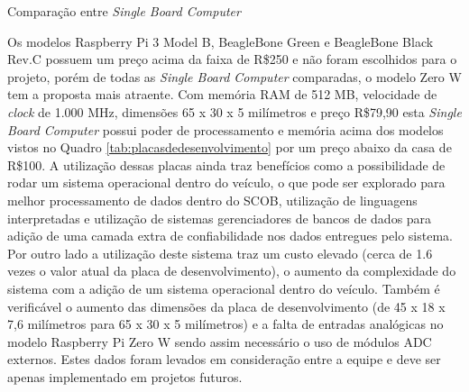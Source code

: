 \begin{table}[!htb]
	\centering
	\caption{Comparação entre \textit{Single Board Computer}}
	\label{tab:singleboard}
	\caption*{Fonte: Elaborada pelo autor, 2017.}
\end{table}

Os modelos Raspberry Pi 3 Model B, BeagleBone Green e BeagleBone Black Rev.C possuem um preço acima da faixa de R\$250 e não foram escolhidos para o projeto, porém de todas as \textit{Single Board Computer} comparadas, o modelo Zero W tem a proposta mais atraente. Com memória RAM de 512 MB, velocidade de \textit{clock} de 1.000 MHz, dimensões 65 x 30 x 5 milímetros e preço R\$79,90 esta \textit{Single Board Computer} possui poder de processamento e memória acima dos modelos vistos no Quadro \ref{tab:placasdedesenvolvimento} por um preço abaixo da casa de R\$100. A utilização dessas placas ainda traz benefícios como a possibilidade de rodar um sistema operacional dentro do veículo, o que pode ser explorado para melhor processamento de dados dentro do SCOB, utilização de linguagens interpretadas e utilização de sistemas gerenciadores de bancos de dados para adição de uma camada extra de confiabilidade nos dados entregues pelo sistema. Por outro lado a utilização deste sistema traz um custo elevado (cerca de 1.6 vezes o valor atual da placa de desenvolvimento), o aumento da complexidade do sistema com a adição de um sistema operacional dentro do veículo. Também é verificável o aumento das dimensões da placa de desenvolvimento (de 45 x 18 x 7,6 milímetros para 65 x 30 x 5 milímetros) e a falta de entradas analógicas no modelo Raspberry Pi Zero W sendo assim necessário o uso de módulos ADC externos. Estes dados foram levados em consideração entre a equipe e deve ser apenas implementado em projetos futuros.


